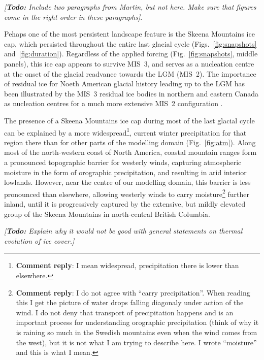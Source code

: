 \documentclass[tc, manuscript]{copernicus}
\newcommand{\renote}[1]{\footnote{\textbf{Comment reply}: #1}}
\newcommand{\todo}[1]{\emph{[\textbf{Todo:} #1]}}
\begin{document}
\todo{Include two paragraphs from Martin, but not here. Make sure that figures
      come in the right order in these paragraphs}.

Pehaps one of the most persistent landscape feature is the Skeena Mountains ice
cap, which persisted throughout the entire last glacial cycle
(Figs.~\ref{fig:snapshots} and~\ref{fig:duration}). Regardless of the applied
forcing (Fig.~\ref{fig:snapshots}, middle panels), this ice cap appears to
survive MIS~3, and serves as a nucleation centre at the onset of the glacial
readvance towards the LGM (MIS~2). The importance of residual ice for Noeth
American glacial history leading up to the LGM has been illustrated by the
MIS~3 residual ice bodies in northern and eastern Canada as nucleation centres
for a much more extensive MIS~2 configuration \citep{Kleman.etal.2010}.

The presence of a Skeena Mountains ice cap during most of the last glacial
cycle can be explained by a more widespread\renote{
    I mean widespread, precipitation there is lower than elsewhere.},
current winter precipitation for that region there than for other parts of the
modelling domain (Fig.~\ref{fig:atm}). Along most of the north-western coast of
North America, coastal mountain ranges form a pronounced topographic barrier
for westerly winds, capturing atmospheric moisture in the form of orographic
precipitation, and resulting in arid interior lowlands. However, near the
centre of our modelling domain, this barrier is less pronounced than elsewhere,
allowing westerly winds to carry moisture\renote{
    I do not agree with ``carry precipitation''. When reading this I get the
    picture of water drops falling diagonaly under action of the wind. I do not
    deny that transport of precipitation happens and
    is an important process for understanding orographic
    precipitation (think of why it is raining so much in the Swedish mountains
    even when the wind comes from the west), but it is not what I am trying to
    describe here. I wrote ``moisture'' and this is what I mean.}
further inland, until it is progressively captured by the extensive, but mildly
elevated group of the Skeena Mountains in north-central British Columbia.

\todo{Explain why it would not be good with general statements on thermal
      evolution of ice cover.}
\end{document}
